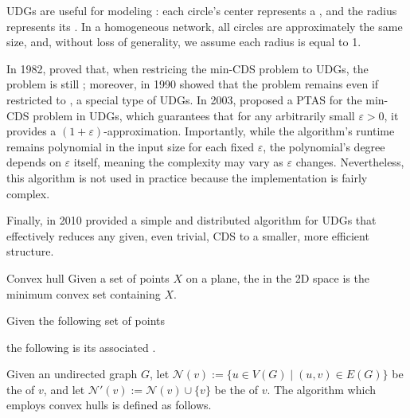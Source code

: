 \documentclass[a4paper, 12pt]{report}
\begin{document}
    UDGs are useful for modeling : each circle's center represents a , and the radius represents its . In a homogeneous network, all circles are approximately the same size, and, without loss of generality, we assume each radius is equal to 1.

    In 1982, \textcite{lichtenstein} proved that, when restricing the min-CDS problem to UDGs, the problem is still \NPHard; moreover, in 1990 \textcite{clark} showed that the problem remains \NPHard even if restricted to , a special type of UDGs. In 2003, \textcite{cheng} proposed a PTAS for the min-CDS problem in UDGs, which guarantees that for any arbitrarily small $\varepsilon > 0$, it provides a $(1 + \varepsilon)$-approximation. Importantly, while the algorithm's runtime remains polynomial in the input size for each fixed $\varepsilon$, the polynomial's degree depends on $\varepsilon$ itself, meaning the complexity may vary as $\varepsilon$ changes. Nevertheless, this algorithm is not used in practice because the implementation is fairly complex.

    Finally, in 2010 \textcite{purohit} provided a simple and distributed algorithm for UDGs that effectively reduces any given, even trivial, CDS to a smaller, more efficient structure.

    \begin{frameddefn}{Convex hull}
        Given a set of points $X$ on a plane, the  in the 2D space is the minimum convex set containing $X$.
    \end{frameddefn}

    \begin{example}
        Given the following set of points


        the following is its associated .

    \end{example}

    Given an undirected graph $G$, let $\mathcal N(v) := \{u \in V(G) \mid (u, v) \in E(G)\}$ be the  of $v$, and let $\mathcal N'(v) := \mathcal N (v) \cup \{v\}$ be the  of $v$. The algorithm which employs convex hulls is defined as follows.
\end{document}
